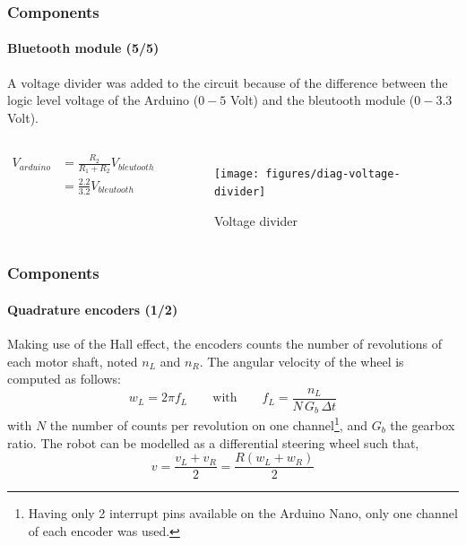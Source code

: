 \documentclass[10pt]{beamer}
\begin{document}
\begin{frame}
\frametitle{Components}
\framesubtitle{Bluetooth module (5/5)}
A voltage divider was added to the circuit because of the difference between the logic level voltage of the Arduino ($0-5$ Volt) and the bleutooth module ($0-3.3$ Volt). 
\begin{columns}[c]

\begin{align*} 
V_{arduino} &=  \frac{R_2}{R_1+R_2}V_{bleutooth} \\[0.4cm]
 &=  \frac{2.2}{3.2}V_{bleutooth}
\end{align*}

\begin{figure}[hbtp]
\centering
\texttt{[image: figures/diag-voltage-divider]}
\caption{Voltage divider}
\end{figure}

\end{columns}
\end{frame}


\begin{frame}
\frametitle{Components}
\framesubtitle{Quadrature encoders (1/2)}
Making use of the Hall effect, the encoders counts the number of revolutions of each motor shaft, noted $n_L$ and $n_R$. The angular velocity of the wheel is computed as follows:
$$ 
w_L = 2\pi f_L
\qquad\text{with}\qquad	
f_L = \frac{n_L}{N\, G_b \, \Delta{t} }
$$
with $N$ the number of counts per revolution on one channel\footnote{Having only 2 interrupt pins available on the Arduino Nano, only one channel of each encoder was used.}, and $G_b$ the gearbox ratio. The robot can be modelled as a differential steering wheel such that,
$$ 
v = \frac{v_L + v_R}{2} = \frac{R(w_L + w_R)}{2}
$$
\end{frame}

\end{document}
